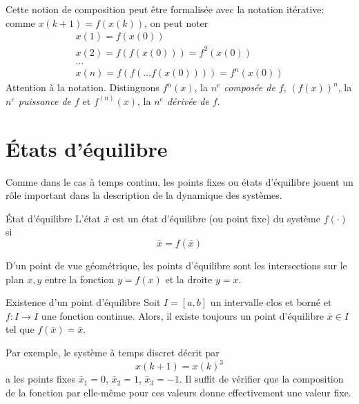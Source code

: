         Cette notion de composition peut être formalisée avec la notation itérative: comme $x(k+1) = f(x(k))$, on peut noter 
        \begin{equation}
            \begin{split}
                x(1) = f(x(0)) \\
                x(2) = f(f(x(0))) = f^2(x(0)) \\
                \dots\\
                x(n) = f(f(\dots f(x(0)))) = f^n(x(0))
            \end{split}
        \end{equation}
        Attention à la notation. Distinguons $f^n(x)$, la \textit{$n^e$ composée de $f$}, $(f(x))^n$, la \textit{$n^e$ puissance de $f$} et $f^{(n)}(x)$, la \textit{$n^e$ dérivée de $f$}. 

    \section{États d'équilibre}
        Comme dans le cas à temps continu, les points fixes ou états d'équilibre jouent un rôle important dans la description de la dynamique des systèmes.

        \begin{definition}{État d'équilibre}
            L’état $\bar{x}$ est un état d’équilibre (ou point fixe) du système $f(\cdot)$ si
            \begin{equation}
                \bar{x} = f(\bar{x})
            \end{equation}
        \end{definition}
        D'un point de vue géométrique, les points d’équilibre sont les intersections sur le plan $x, y$ entre la fonction $y = f(x)$ et la droite $y = x$.
        \begin{theorem}{Existence d'un point d'équilibre}
            Soit $I = [a, b]$ un intervalle clos et borné et $f : I \to I$ une fonction continue. Alors, il existe toujours un point d’équilibre $\bar{x} \in I$ tel que $f(\bar{x}) = \bar{x}$.
        \end{theorem}

        Par exemple, le système à temps discret décrit par
        \begin{equation}
            x(k + 1) = x(k)^3
        \end{equation}
        a les points fixes $\bar{x}_1 = 0$, $\bar{x}_2 = 1$, $\bar{x}_3 = -1$. Il suffit de vérifier que la composition de la fonction par elle-même pour ces valeurs donne effectivement une valeur fixe.

